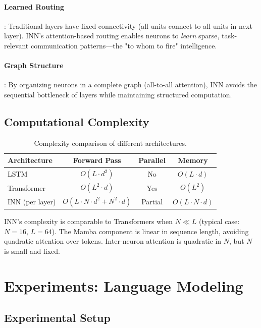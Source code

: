 \documentclass{article}
\begin{document}
\paragraph{Learned Routing}: Traditional layers have fixed connectivity (all units connect to all units in next layer). INN's attention-based routing enables neurons to \emph{learn} sparse, task-relevant communication patterns—the "to whom to fire" intelligence.

\paragraph{Graph Structure}: By organizing neurons in a complete graph (all-to-all attention), INN avoids the sequential bottleneck of layers while maintaining structured computation.

\subsection{Computational Complexity}

\begin{table}[h]
\centering
\caption{Complexity comparison of different architectures.}
\begin{tabular}{lccc}
\toprule
\textbf{Architecture} & \textbf{Forward Pass} & \textbf{Parallel} & \textbf{Memory} \\
\midrule
LSTM & $O(L \cdot d^2)$ & No & $O(L \cdot d)$ \\
Transformer & $O(L^2 \cdot d)$ & Yes & $O(L^2)$ \\
INN (per layer) & $O(L \cdot N \cdot d^2 + N^2 \cdot d)$ & Partial & $O(L \cdot N \cdot d)$ \\
\bottomrule
\end{tabular}
\label{tab:complexity}
\end{table}

INN's complexity is comparable to Transformers when $N \ll L$ (typical case: $N=16$, $L=64$). The Mamba component is linear in sequence length, avoiding quadratic attention over tokens. Inter-neuron attention is quadratic in $N$, but $N$ is small and fixed.

\section{Experiments: Language Modeling}

\subsection{Experimental Setup}
\end{document}
